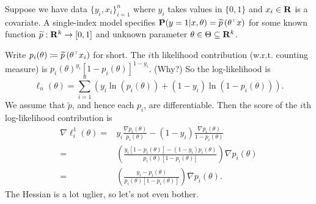 \documentclass[11pt,letterpaper,reqno,oneside]{article}
\begin{document}
\begin{example}
	Suppose we have data $\{ y_i, x_i \}_{i=1}^n$ where $y_i$ takes values in $\{0,1\}$ and $x_i \in \mathbf{R}$ is a covariate. A single-index model specifies $\mathbf{P}(y=1|x,\theta) = \widetilde{p}\left(\theta^{\scriptscriptstyle \top} x \right)$ for some known function $\widetilde{p} : \mathbf{R}^k \to [0,1]$ and unknown parameter $\theta \in \Theta \subseteq \mathbf{R}^k$.

	Write $p_i(\theta) \coloneqq \widetilde{p}\left(\theta^{\scriptscriptstyle \top} x_i \right)$ for short. The $i$th likelihood contribution (w.r.t. counting measure) is $p_i(\theta)^{y_i} [ 1-p_i(\theta) ]^{1-y_i}$. (Why?) So the log-likelihood is
	\begin{equation*}
		\ell_n(\theta) 
		= \sum_{i=1}^n \left( y_i \ln( p_i(\theta) ) 
		+ (1-y_i) \ln( 1 - p_i(\theta) ) \right) .
	\end{equation*}
	We assume that $\widetilde{p}$, and hence each $p_i$, are differentiable. Then the score of the $i$th log-likelihood contribution is
	\begin{align*}
		\nabla \ell^1_i(\theta) 
		={}& 
		y_i \frac{ \nabla p_i(\theta) }{ p_i(\theta) } 
		- (1-y_i) \frac{ \nabla p_i(\theta) }{ 1 - p_i(\theta) }
		\\
		={}& \left( 
		\frac{ y_i [ 1 - p_i(\theta) ] - (1-y_i) p_i(\theta) }
		{ p_i(\theta) [ 1 - p_i(\theta) ] } 
		\right) \nabla p_i(\theta)
		\\
		={}& \left(
		\frac{ y_i - p_i(\theta) }
		{ p_i(\theta) [ 1 - p_i(\theta) ] } 
		\right) \nabla p_i(\theta) .
	\end{align*}
	The Hessian is a lot uglier, so let's not even bother.


\end{example}
\end{document}
